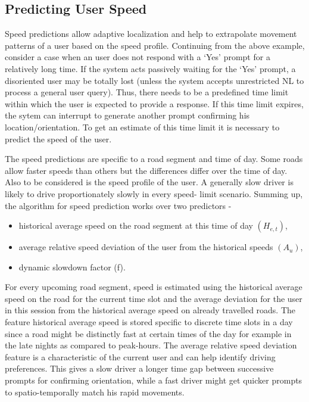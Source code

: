 \documentclass{iitkthesis}
\begin{document}
\subsection{Predicting User Speed}
Speed predictions allow adaptive localization 
and help to extrapolate movement patterns of a user based on the speed 
profile. Continuing from the above example, consider a case when an user 
does not respond with a `Yes' prompt for a relatively long time. If the 
system acts passively waiting for the `Yes' prompt, a disoriented user 
may be totally lost (unless the system accepts unrestricted NL to process 
a general user query). Thus, there needs to be a predefined time limit within 
which the user is expected to provide a response. If this time limit 
expires, the sytem can interrupt to generate another prompt confirming 
his location/orientation. To get an estimate of this time limit it is 
necessary to predict the speed of the user. 

The speed predictions are specific to a road segment and time of day. 
Some roads allow faster speeds than others but the differences 
differ over the time of day.
Also to be considered is the speed profile of the user. A generally 
slow driver is likely to drive proportionately slowly in every speed-
limit scenario. 
Summing up, the algorithm for speed prediction works over two predictors - 
\begin{itemize}
\item historical average speed on the road segment at this time of day 
$(H_{e,t})$,
\item average relative speed deviation of the user from the historical 
speeds $({A_u})$,
\item dynamic slowdown factor (f).
\end{itemize}

For every upcoming road segment, speed is estimated using the historical 
average speed on the road for the current time slot and the average 
deviation for the user in this session from the historical average speed 
on already travelled roads. 
The feature historical average speed is stored specific to discrete time 
slots in a day since a road might be distinctly fast at certain times of
the day for example in the late nights as compared to 
peak-hours. The average relative speed deviation feature is a
characteristic of the current user and can help identify driving preferences. 
This gives a slow driver a longer time gap between successive prompts for 
confirming orientation, while a fast driver might get quicker prompts 
to spatio-temporally match his rapid movements.  
\end{document}
